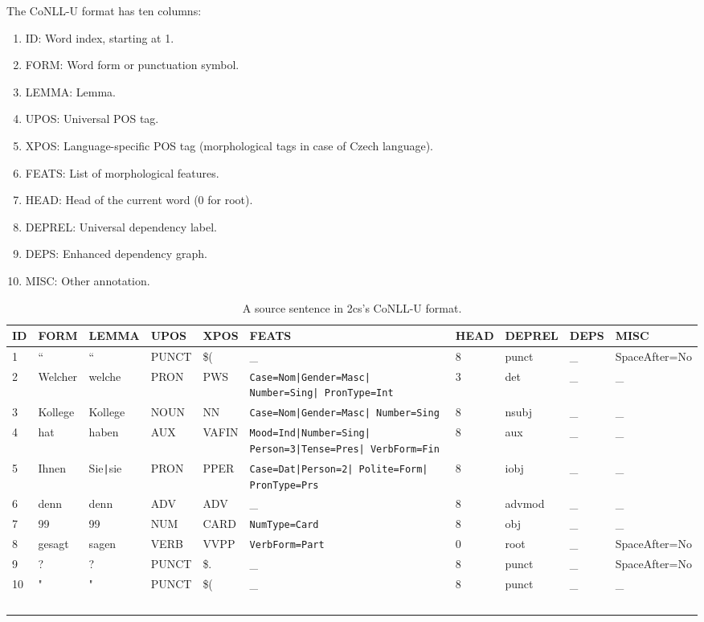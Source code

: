 The CoNLL-U format has ten columns:
\begin{enumerate}
    \item ID: Word index, starting at 1.
    \item FORM: Word form or punctuation symbol.
    \item LEMMA: Lemma.
    \item UPOS: Universal POS tag.
    \item XPOS: Language-specific POS tag (morphological tags in case of Czech language).
    \item FEATS: List of morphological features.
    \item HEAD: Head of the current word (0 for root).
    \item DEPREL: Universal dependency label.
    \item DEPS: Enhanced dependency graph.
    \item MISC: Other annotation.
\end{enumerate}

\begin{landscape}
    \begin{table}[t]
    \begin{center}
    \begin{tabular}{l|l|l|l|l|p{4.7cm}|l|l|l|l}
        \textbf{ID} & \textbf{FORM} & \textbf{LEMMA} & \textbf{UPOS} & \textbf{XPOS} & \textbf{FEATS} & \textbf{HEAD} & \textbf{DEPREL} & \textbf{DEPS} & \textbf{MISC} \\
     \hline
     1 & `` & `` & PUNCT & \$( & \_ & 8 & punct & \_ & SpaceAfter=No \\
     2 & Welcher & welche & PRON & PWS & \texttt{Case=Nom|Gender=Masc| Number=Sing| PronType=Int} & 3 & det & \_ & \_ \\
     3 & Kollege & Kollege & NOUN & NN & \texttt{Case=Nom|Gender=Masc| Number=Sing} & 8 & nsubj & \_ & \_ \\
     4 & hat & haben & AUX & VAFIN & \texttt{Mood=Ind|Number=Sing| Person=3|Tense=Pres| VerbForm=Fin} & 8 & aux & \_ & \_ \\
     5 & Ihnen & Sie\texttt{|}sie & PRON & PPER & \texttt{Case=Dat|Person=2| Polite=Form| PronType=Prs} & 8 & iobj & \_ & \_ \\
     6 & denn & denn & ADV & ADV & \_ & 8 & advmod & \_ & \_ \\
     7 & 99 & 99 & NUM & CARD & \texttt{NumType=Card} & 8 & obj & \_ & \_ \\
     8 & gesagt & sagen & VERB & VVPP & \texttt{VerbForm=Part} & 0 & root & \_ & SpaceAfter=No \\
     9 & ? & ? & PUNCT & \$. & \_ & 8 & punct & \_ & SpaceAfter=No \\
     10 & " & " & PUNCT & \$( & \_ & 8 & punct & \_ & \_ \\\
    \end{tabular}
    \end{center}
    \caption{A source sentence in \de2cs's CoNLL-U format.}
    \label{tab:data-decs}
    \end{table}
\end{landscape}

